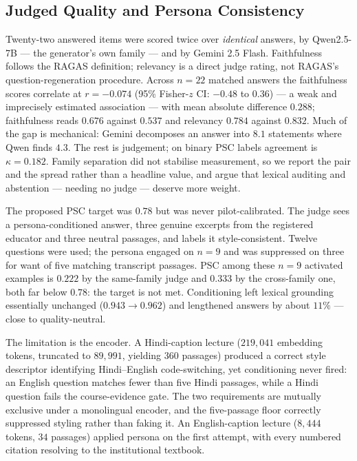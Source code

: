 \documentclass[conference]{IEEEtran}
\begin{document}
\subsection{Judged Quality and Persona Consistency}
\label{sec:judged}
Twenty-two answered items were scored twice over \emph{identical} answers, by
Qwen2.5-7B --- the generator's own family --- and by Gemini 2.5 Flash.
Faithfulness follows the RAGAS definition; relevancy is a direct judge rating,
not RAGAS's question-regeneration procedure. Across $n=22$ matched answers the
faithfulness scores correlate at $r = -0.074$ (95\% Fisher-$z$ CI: $-0.48$ to
$0.36$) --- a weak and imprecisely estimated association --- with mean absolute
difference $0.288$; faithfulness reads $0.676$ against $0.537$ and relevancy
$0.784$ against $0.832$. Much of the gap is mechanical: Gemini decomposes an
answer into $8.1$ statements where Qwen finds $4.3$. The rest is judgement; on
binary PSC labels agreement is $\kappa = 0.182$. Family separation did not
stabilise measurement, so we report the pair and the spread rather than a
headline value, and argue that lexical auditing and abstention --- needing no
judge --- deserve more weight.

The proposed PSC target was $0.78$ but was never pilot-calibrated. The judge
sees a persona-conditioned answer, three genuine excerpts from the registered
educator and three neutral passages, and labels it style-consistent. Twelve
questions were used; the persona engaged on $n=9$ and was suppressed on three
for want of five matching transcript passages. PSC among these $n=9$ activated
examples is $0.222$ by the same-family judge and $0.333$ by the cross-family
one, both far below $0.78$: the target is not met. Conditioning left lexical
grounding essentially unchanged ($0.943 \rightarrow 0.962$) and lengthened
answers by about $11\%$ --- close to quality-neutral.

The limitation is the encoder. A Hindi-caption lecture ($219{,}041$ embedding
tokens, truncated to $89{,}991$, yielding $360$ passages) produced a correct
style descriptor identifying Hindi--English code-switching, yet conditioning
never fired: an English question matches fewer than five Hindi passages, while a
Hindi question fails the course-evidence gate. The two requirements are mutually
exclusive under a monolingual encoder, and the five-passage floor correctly
suppressed styling rather than faking it. An English-caption lecture ($8{,}444$
tokens, $34$ passages) applied persona on the first attempt, with every numbered
citation resolving to the institutional textbook.
\end{document}
